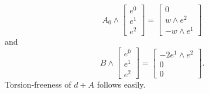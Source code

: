 \documentclass{amsart}
\theoremstyle{definition}
\theoremstyle{remark}
\numberwithin{equation}{section}
\begin{document}
\[
A_0 \wedge \left[ \begin{matrix} e^0 \\ e^1 \\ e^2 \end{matrix} \right] = \left[ \begin{matrix} 0 \\ w \wedge e^2 \\ -w \wedge e^1 \end{matrix} \right]
\]
and
\[
B \wedge \left[ \begin{matrix} e^0 \\ e^1 \\ e^2 \end{matrix} \right] = \left[ \begin{matrix} -2 e^1 \wedge e^2 \\ 0 \\ 0 \end{matrix} \right].
\]
Torsion-freeness of $d + A$ follows easily.
\end{document}
